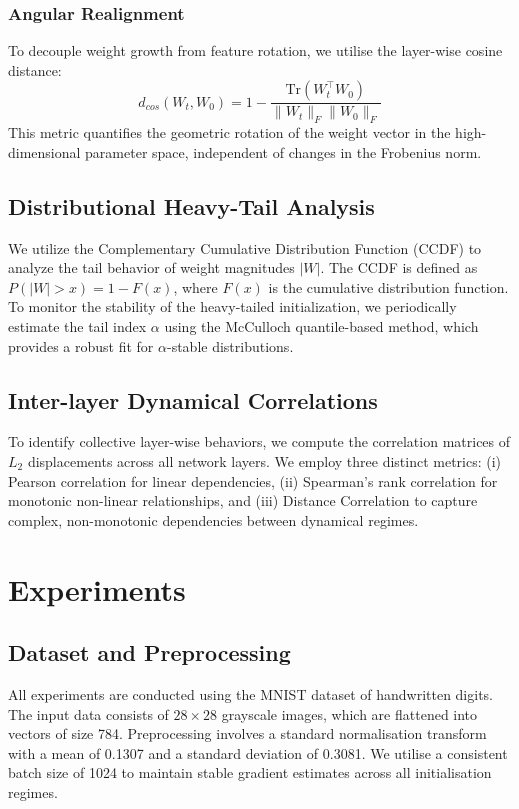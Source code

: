 \documentclass[11pt,a4paper]{article}
\begin{document}
\subsubsection{Angular Realignment}
To decouple weight growth from feature rotation, we utilise the layer-wise cosine distance:
\begin{equation}
	d_{cos}(W_t, W_0) = 1 - \frac{\text{Tr}(W_t^\top W_0)}{\|W_t\|_F \|W_0\|_F}
\end{equation}
This metric quantifies the geometric rotation of the weight vector in the high-dimensional parameter space, independent of changes in the Frobenius norm.
\subsection{Distributional Heavy-Tail Analysis}
We utilize the Complementary Cumulative Distribution Function (CCDF) to analyze the tail behavior of weight magnitudes $|W|$. The CCDF is defined as $P(|W| > x) = 1 - F(x)$, where $F(x)$ is the cumulative distribution function. To monitor the stability of the heavy-tailed initialization, we periodically estimate the tail index $\alpha$ using the McCulloch quantile-based method, which provides a robust fit for $\alpha$-stable distributions.
\subsection{Inter-layer Dynamical Correlations}
To identify collective layer-wise behaviors, we compute the correlation matrices of $L_2$ displacements across all network layers. We employ three distinct metrics: (i) Pearson correlation for linear dependencies, (ii) Spearman’s rank correlation for monotonic non-linear relationships, and (iii) Distance Correlation to capture complex, non-monotonic dependencies between dynamical regimes.
\section{Experiments}
\subsection{Dataset and Preprocessing}
All experiments are conducted using the MNIST dataset of handwritten digits. The input data consists of $28 \times 28$ grayscale images, which are flattened into vectors of size 784. Preprocessing involves a standard normalisation transform with a mean of 0.1307 and a standard deviation of 0.3081. We utilise a consistent batch size of 1024 to maintain stable gradient estimates across all initialisation regimes.
\end{document}
